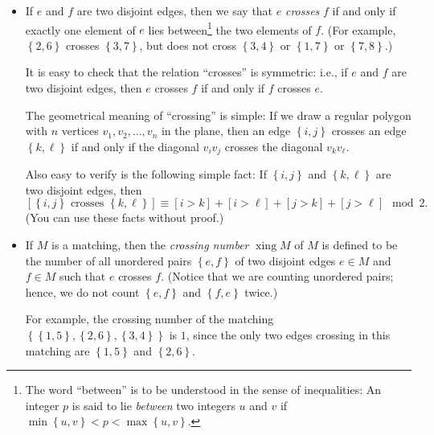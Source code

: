 \documentclass[numbers=enddot,12pt,final,onecolumn,notitlepage]{scrartcl}%
\theoremstyle{definition}
\newcommand{\xing}{\operatorname{xing}}
\newcommand{\set}[1]{\left\{ #1 \right\}}
\newcommand{\ive}[1]{\left[ #1 \right]}
\begin{document}
\begin{itemize}
\item If $e$ and $f$ are two disjoint
      edges, then we say that
      $e$ \textit{crosses} $f$
      if and only if exactly one element of $e$ lies
      between\footnote{The word ``between'' is to be
      understood in the sense of inequalities:
      An integer $p$ is said to lie \textit{between}
      two integers $u$ and $v$
      if $\min \set{u, v} < p < \max \set{u, v}$.}
      the two elements of $f$.
      (For example, $\set{2, 6}$ crosses $\set{3, 7}$,
      but does not cross $\set{3, 4}$ or $\set{1, 7}$
      or $\set{7, 8}$.)
      \par
      It is easy to check
      that the relation ``crosses'' is symmetric:
      i.e., if $e$ and $f$ are two disjoint edges, then
      $e$ crosses $f$ if and only if $f$ crosses $e$.
      \par
      The geometrical meaning of ``crossing'' is simple:
      If we draw a regular polygon with $n$ vertices
      $v_1, v_2, \ldots, v_n$ in the plane, then an
      edge $\set{i, j}$ crosses an edge $\set{k, \ell}$ if
      and only if the diagonal $v_i v_j$ crosses the
      diagonal $v_k v_\ell$.
      \par
      Also easy to verify is the following simple fact:
      If $\set{i, j}$ and $\set{k, \ell}$ are
      two disjoint edges, then
      \begin{equation}
      \ive{\set{i, j} \text{ crosses } \set{k, \ell}}
      \equiv \ive{i > k} + \ive{i > \ell} + \ive{j > k}
             + \ive{j > \ell} \mod 2 .
      \label{eq.mt3.xing.crosses-4}
      \end{equation}
      (You can use these facts without proof.)

\item If $M$ is a matching, then the
      \textit{crossing number} $\xing M$
      of $M$ is defined to be the
      number of all unordered pairs $\set{e, f}$ of two
      disjoint edges $e \in M$ and $f \in M$ such that
      $e$ crosses $f$.
      (Notice that we are counting unordered pairs;
      hence, we do not count $\set{e, f}$ and $\set{f, e}$
      twice.)
      \par
      For example, the crossing number of the matching
      $\set{\set{1, 5}, \set{2, 6}, \set{3, 4}}$ is $1$,
      since the only two edges crossing in this matching
      are $\set{1, 5}$ and $\set{2, 6}$.
\end{itemize}
\end{document}
